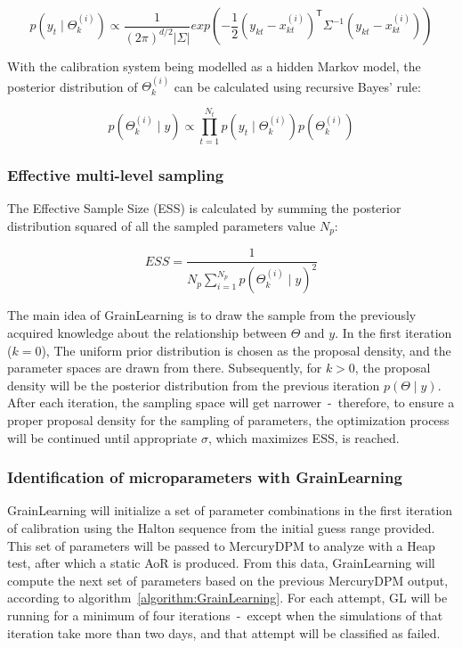 \begin{equation} \label{eq:likelihood}
p(y_t \mid \Theta_{k}^{(i)}) \propto \frac{1}{(2\pi)^{d/2}|\Sigma|}exp\left(-\frac{1}{2}(y_{kt} - x^{(i)}_{kt})^{\mathsf{T}}\Sigma^{-1}(y_{kt} - x^{(i)}_{kt} )\right)
\end{equation}

With the calibration system being modelled as a hidden Markov model, the posterior distribution of $\Theta_{k}^{(i)}$ can be calculated using recursive Bayes' rule: 

\begin{equation} \label{eq:posterior}
    p(\Theta_{k}^{(i)} \mid y) \propto \prod_{t=1}^{N_{t}} p(y_t \mid \Theta_{k}^{(i)} )p( \Theta_{k}^{(i)} ) 
\end{equation}

\subsubsection{Effective multi-level sampling}

The Effective Sample Size (ESS) is calculated by summing the posterior distribution squared of all the sampled parameters value $N_{p}$:

\begin{equation} \label{eq:ESS}
ESS = \frac{1}{N_{p} \sum_{i=1}^{N_{p}} p(\Theta_{k}^{(i)} \mid y)^2}
\end{equation}

The main idea of GrainLearning is to draw the sample from the previously acquired knowledge about the relationship between $\Theta$ and $y$. In the first iteration ($k = 0$), The uniform prior distribution is chosen as the proposal density, and the parameter spaces are drawn from there. Subsequently, for $k > 0$, the proposal density will be the posterior distribution from the previous iteration $p(\Theta \mid y)$. After each iteration, the sampling space will get narrower~-~therefore, to ensure a proper proposal density for the sampling of parameters, the optimization process will be continued until appropriate $\sigma$, which maximizes ESS, is reached. 

\subsubsection{Identification of microparameters with GrainLearning}
GrainLearning will initialize a set of parameter combinations in the first iteration of calibration using the Halton sequence from the initial guess range provided. This set of parameters will be passed to MercuryDPM to analyze with a Heap test, after which a static AoR is produced. From this data, GrainLearning will compute the next set of parameters based on the previous MercuryDPM output, according to algorithm~\ref{algorithm:GrainLearning}. For each attempt, GL will be running for a minimum of four iterations~-~except when the simulations of that iteration take more than two days, and that attempt will be classified as failed. 





    